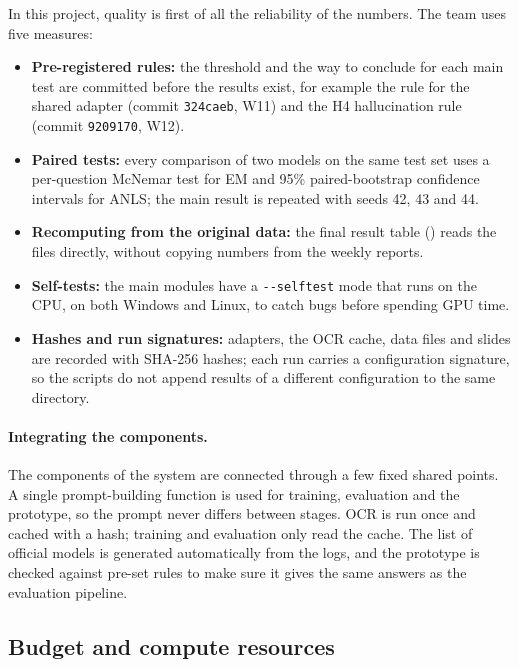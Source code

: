 In this project, quality is first of all the reliability of the numbers. The team uses five
measures:

\begin{itemize}
  \item \textbf{Pre-registered rules:} the threshold and the way to conclude for each main test
  are committed before the results exist, for example the rule for the shared adapter (commit
  \texttt{324caeb}, W11) and the H4 hallucination rule (commit \texttt{9209170}, W12).
  \item \textbf{Paired tests:} every comparison of two models on the same test set uses a
  per-question McNemar test for EM and 95\% paired-bootstrap confidence intervals for ANLS; the
  main result is repeated with seeds 42, 43 and 44.
  \item \textbf{Recomputing from the original data:} the final result table
  () reads the  files directly, without
  copying numbers from the weekly reports.
  \item \textbf{Self-tests:} the main modules have a \texttt{-{}-selftest} mode that runs on the
  CPU, on both Windows and Linux, to catch bugs before spending GPU time.
  \item \textbf{Hashes and run signatures:} adapters, the OCR cache, data files and slides are
  recorded with SHA-256 hashes; each run carries a configuration signature, so the scripts do
  not append results of a different configuration to the same directory.
\end{itemize}

\paragraph{Integrating the components.} The components of the system are connected through a few fixed shared points. A
single prompt-building function is used for training, evaluation and the prototype,
so the prompt never differs between stages. OCR is run once and cached with a hash;
training and evaluation only read the cache. The list of official models is generated
automatically from the logs, and the prototype is checked against pre-set rules to
make sure it gives the same answers as the evaluation pipeline.

\subsection{Budget and compute resources}
\label{sec:pm-budget}

